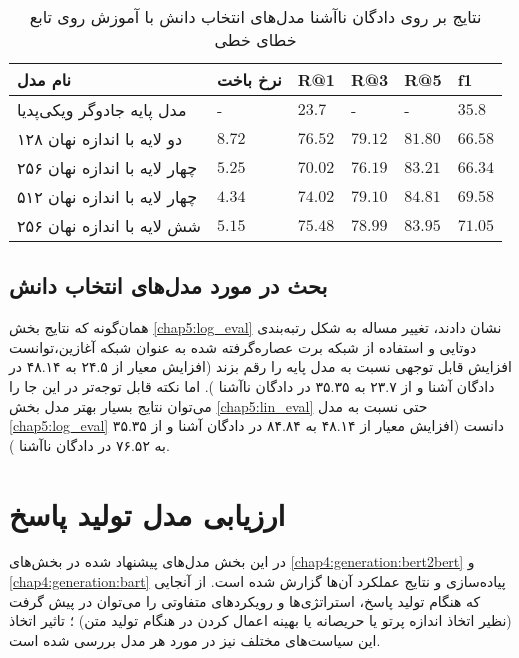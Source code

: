 \begin{table}[h]
	\caption{نتایج بر روی دادگان ناآشنا مدل‌های انتخاب دانش با آموزش روی تابع خطای خطی }
	\centering
	\label{table:knowledge:lin:unseen}
	\begin{tabular}{|l|l|l|l|l|l|}
		\hline
		نام مدل                      & نرخ باخت & R@1     & R@3     & R@5     & f1      \\ \hline
		مدل پایه جادوگر ویکی‌پدیا    & -       & $23.7$  & -       & -       & $35.8$  \\ \hline
		دو لایه با اندازه نهان ۱۲۸   & $8.72$  & $76.52$ & $79.12$ & $81.80$ & $66.58$ \\ \hline
		چهار لایه با اندازه نهان ۲۵۶ & $5.25$  & $70.02$ & $76.19$ & $83.21$ & $66.34$ \\ \hline
		چهار لایه با اندازه نهان ۵۱۲ & $4.34$  & $74.02$ & $79.10$ & $84.81$ & $69.58$ \\ \hline
		شش لایه با اندازه نهان ۲۵۶   & $5.15$  & $75.48$ & $78.99$ & $83.95$ & $71.05$ \\ \hline
	\end{tabular}
\end{table}

\subsection{بحث در مورد مدل‌های انتخاب دانش}

همان‌گونه که نتایج بخش 
\ref{chap5:log_eval}
نشان دادند، تغییر مساله به شکل رتبه‌بندی دوتایی و استفاده از شبکه برت عصاره‌گرفته شده به عنوان شبکه آغازین،‌توانست افزایش قابل توجهی نسبت به مدل پایه را رقم بزند (افزایش معیار
از ۲۴.۵ به ۴۸.۱۴ در دادگان آشنا و از ۲۳.۷ به ۳۵.۳۵ در دادگان ناآشنا
).
اما نکته قابل توجه‌تر در این جا را می‌توان نتایج بسیار بهتر مدل بخش
\ref{chap5:lin_eval}
حتی نسبت به مدل 
\ref{chap5:log_eval}
دانست (افزایش معیار
از ۴۸.۱۴ به ۸۴.۸۴ در دادگان آشنا و از ۳۵.۳۵ به ۷۶.۵۲ در دادگان ناآشنا
).

\section{ارزیابی مدل تولید پاسخ}

در این بخش مدل‌های پیشنهاد شده در بخش‌های 
\ref{chap4:generation:bert2bert}
و
\ref{chap4:generation:bart}
پیاده‌سازی و نتایج عملکرد آن‌ها گزارش شده است. از آنجایی که هنگام تولید پاسخ، استراتژی‌ها و رویکرد‌های متفاوتی را می‌توان در پیش گرفت (نظیر اتخاذ اندازه پرتو یا حریصانه یا بهینه اعمال کردن در هنگام تولید متن) ؛ تاثیر اتخاذ این سیاست‌های مختلف نیز در مورد هر مدل بررسی شده است.


